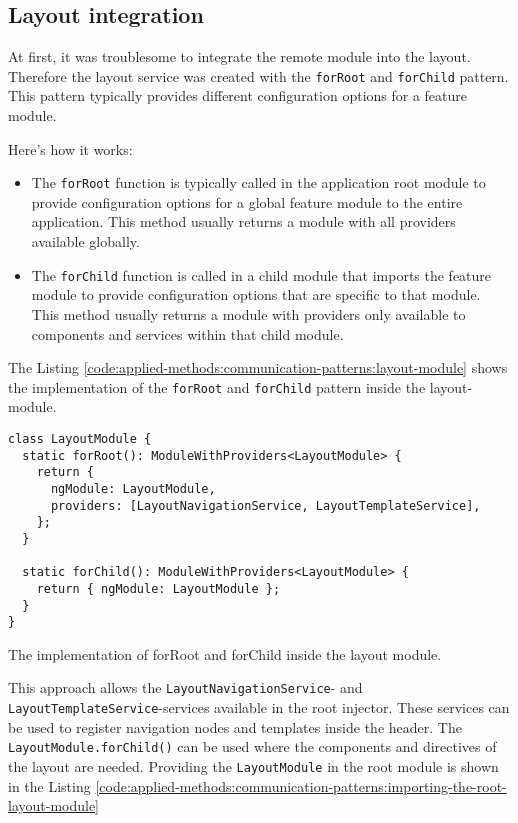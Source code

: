 \subsection{Layout integration}\label{subsection:applied-methods:communication-patterns:layout-integration}

At first, it was troublesome to integrate the remote module into the layout. Therefore the layout service was created with the \texttt{forRoot} and \texttt{forChild} pattern. This pattern typically provides different configuration options for a feature module.

\bigskip

\noindent Here's how it works:

\begin{itemize}
  \item The \texttt{forRoot} function is typically called in the application root module to provide configuration options for a global feature module to the entire application. This method usually returns a module with all providers available globally.
  \item The \texttt{forChild} function is called in a child module that imports the feature module to provide configuration options that are specific to that module. This method usually returns a module with providers only available to components and services within that child module.
\end{itemize}

\noindent The Listing \ref{code:applied-methods:communication-patterns:layout-module} shows the implementation of the \texttt{forRoot} and \texttt{forChild} pattern inside the layout-module.

\ifshowListings
  \begin{listing}[H]
  \begin{verbatim}
class LayoutModule {
  static forRoot(): ModuleWithProviders<LayoutModule> {
    return {
      ngModule: LayoutModule,
      providers: [LayoutNavigationService, LayoutTemplateService],
    };
  }

  static forChild(): ModuleWithProviders<LayoutModule> {
    return { ngModule: LayoutModule };
  }
}
  \end{verbatim}
  \caption{The implementation of forRoot and forChild inside the layout module.}\label{code:applied-methods:communication-patterns:layout-module}
  \end{listing}
\fi

\noindent This approach allows the \texttt{LayoutNavigationService}- and \texttt{LayoutTemplateService}-services available in the root injector. These services can be used to register navigation nodes and templates inside the header. The \texttt{LayoutModule.forChild()} can be used where the components and directives of the layout are needed. Providing the \texttt{LayoutModule} in the root module is shown in the Listing \ref{code:applied-methods:communication-patterns:importing-the-root-layout-module}

